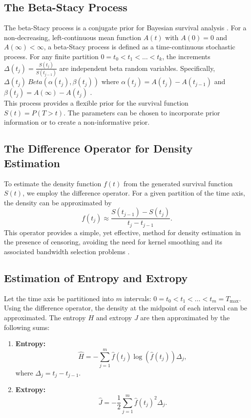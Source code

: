 \documentclass[twoside]{article}
\begin{document}
\subsection{The Beta-Stacy Process}
The beta-Stacy process is a conjugate prior for Bayesian survival analysis
\citep{12} . 
For a non-decreasing, left-continuous mean function 
$A(t)$ 
with 
$A(0)=0$ 
and 
$A(\infty)<\infty$, 
a beta-Stacy process is defined as a time-continuous stochastic process. 
For any finite partition 
$0 = t_0 < t_1 < \ldots < t_k$, 
the increments
$\Delta (t_j) = \frac{S(t_j)}{S(t_{j-1})}$
are independent beta random variables. 
Specifically,
$\Delta(t_j) ~ Beta( \alpha(t_j) , \beta(t_j) )$
where 
$\alpha(t_j) = A(t_j) - A(t_{j-1})$ 
and 
$\beta(t_j) = A(\infty) - A(t_j)$
\citep{12}. 
\\
This process provides a flexible prior for the survival function 
$S(t) = P(T > t)$. 
The parameters can be chosen to incorporate prior information or to create a non-informative prior. 

\subsection{The Difference Operator for Density Estimation}
To estimate the density function 
$f(t)$ 
from the generated survival function 
$S(t)$, 
we employ the difference operator. 
For a given partition of the time axis, the density can be approximated by
\begin{equation*}
f(t_j) \approx \frac{S(t_{j-1}) - S(t_j)}{t_j - t_{j-1}}.
\end{equation*}
This operator provides a simple, yet effective, method for density estimation in the presence of censoring, avoiding the need for kernel smoothing and its associated bandwidth selection problems
\citep{11}. 
\subsection{Estimation of Entropy and Extropy}
Let the time axis be partitioned into
$m$ 
intervals: 
$0 = t_0 < t_1 < \ldots < t_m = T_{\mathrm{max}}$. 
Using the difference operator, the density at the midpoint of each interval can be approximated. 
The entropy 
$H$ 
and extropy 
$J$ 
are then approximated by the following sums: 
\begin{enumerate}
\item
\textbf{Entropy:}
\begin{equation*}
\hat{H} = - \sum_{j=1}^{m} \hat{f}(t_j) \log(\hat{f}(t_j)) \Delta_{j},
\end{equation*}
where
$\Delta_{j} = t_j - t_{j-1}$.
\item
\textbf{Extropy:}
\begin{equation*}
\hat{J} = -\frac{1}{2} \sum_{j=1}^{m} \hat{f}(t_j)^{2} \Delta_j
.
\end{equation*}
\end{enumerate}
\end{document}
